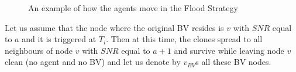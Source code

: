 \begin{figure} [H]
      \hspace{1in} 
  \caption{An example of how the agents move in the Flood Strategy} 
  \label{fig:Arbiflood} %
\end{figure}      

Let us assume that the node where the original BV resides is $v$ with $SNR$ equal to $a$ and it is triggered at $T_i$. Then at this time, the clones spread to all neighbours of node $v$ with $SNR$ equal to $a+1$ and survive while leaving node $v$ clean (no agent and no BV) and let us denote by $v_{BV}$s all these BV nodes.  

